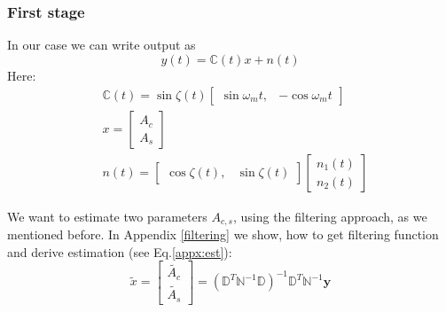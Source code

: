 \subsubsection{First stage}
In our case we can write output as
\begin{equation}
 y(t)=\mathbb{C}(t)x+n(t)
\end{equation}
Here:
\begin{align}
& \mathbb{C}(t) = \sin\zeta(t)
\begin{bmatrix}
 \sin\omega_mt, & -\cos\omega_mt
\end{bmatrix}
\\
&
x=
\begin{bmatrix}
 A_c\\
A_s
\end{bmatrix}
\\
& n(t) = 
\begin{bmatrix}
 \cos\zeta(t), & \sin\zeta(t)
\end{bmatrix}
\begin{bmatrix}
 n_1(t)\\
n_2(t)
\end{bmatrix}
\end{align}

We want to estimate two parameters $A_{c,s}$, using the filtering approach, as we mentioned before. In Appendix \ref{filtering} we show, how to get filtering function and derive estimation (see Eq.\ref{appx:est}):
\begin{equation}
 \tilde{x} =
\begin{bmatrix}
 \tilde{A_c}\\
\tilde{A_s}
\end{bmatrix}
= (\mathbb{D}^T\mathbb{N}^{-1}\mathbb{D})^{-1}\mathbb{D}^T\mathbb{N}^{-1}\mathbf{y}
\end{equation}

